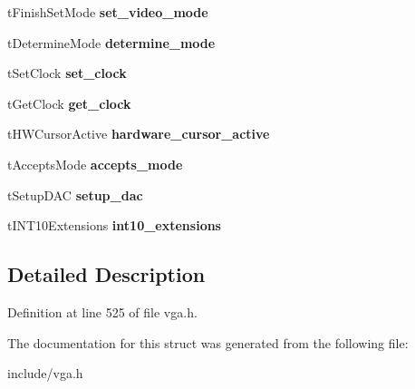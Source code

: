 \begin{DoxyCompactItemize}
\item 
\hypertarget{structSVGA__Driver_afad168056782b84b2eec03c3e0b6f132}{t\-Finish\-Set\-Mode {\bfseries set\-\_\-video\-\_\-mode}}\label{structSVGA__Driver_afad168056782b84b2eec03c3e0b6f132}

\item 
\hypertarget{structSVGA__Driver_a2d72eb682afc752821c0f1ec4e3d0ce3}{t\-Determine\-Mode {\bfseries determine\-\_\-mode}}\label{structSVGA__Driver_a2d72eb682afc752821c0f1ec4e3d0ce3}

\item 
\hypertarget{structSVGA__Driver_a59225904a80dbe9f92d9ba2ee227e1f8}{t\-Set\-Clock {\bfseries set\-\_\-clock}}\label{structSVGA__Driver_a59225904a80dbe9f92d9ba2ee227e1f8}

\item 
\hypertarget{structSVGA__Driver_a209ef280bb27f00d2226050998cd5cb0}{t\-Get\-Clock {\bfseries get\-\_\-clock}}\label{structSVGA__Driver_a209ef280bb27f00d2226050998cd5cb0}

\item 
\hypertarget{structSVGA__Driver_a3936aa6067ba314fe1aa38fbc89933cd}{t\-H\-W\-Cursor\-Active {\bfseries hardware\-\_\-cursor\-\_\-active}}\label{structSVGA__Driver_a3936aa6067ba314fe1aa38fbc89933cd}

\item 
\hypertarget{structSVGA__Driver_a80ae597edcf43eeb150550b23752729c}{t\-Accepts\-Mode {\bfseries accepts\-\_\-mode}}\label{structSVGA__Driver_a80ae597edcf43eeb150550b23752729c}

\item 
\hypertarget{structSVGA__Driver_a5968c7cd8b28c97aea5860fbe6433e02}{t\-Setup\-D\-A\-C {\bfseries setup\-\_\-dac}}\label{structSVGA__Driver_a5968c7cd8b28c97aea5860fbe6433e02}

\item 
\hypertarget{structSVGA__Driver_aff7ace887c47e1f700375eb6324b1d91}{t\-I\-N\-T10\-Extensions {\bfseries int10\-\_\-extensions}}\label{structSVGA__Driver_aff7ace887c47e1f700375eb6324b1d91}

\end{DoxyCompactItemize}


\subsection{Detailed Description}


Definition at line 525 of file vga.\-h.



The documentation for this struct was generated from the following file\-:\begin{DoxyCompactItemize}
\item 
include/vga.\-h\end{DoxyCompactItemize}
